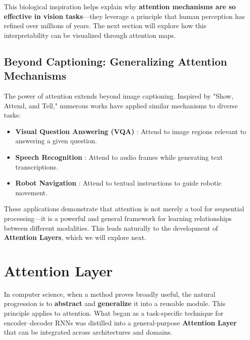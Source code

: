 \noindent This biological inspiration helps explain why \textbf{attention mechanisms are so effective in vision tasks}—they leverage a principle that human perception has refined over millions of years. The next section will explore how this interpretability can be visualized through attention maps.

\subsection{Beyond Captioning: Generalizing Attention Mechanisms}

\noindent The power of attention extends beyond image captioning. Inspired by "Show, Attend, and Tell," numerous works have applied similar mechanisms to diverse tasks:

\begin{itemize}
    \item \textbf{Visual Question Answering (VQA)} \cite{xu2016_askattend}: Attend to image regions relevant to answering a given question.
    \item \textbf{Speech Recognition} \cite{chan2016_listenattend}: Attend to audio frames while generating text transcriptions.
    \item \textbf{Robot Navigation} \cite{mei2016_listenwalk}: Attend to textual instructions to guide robotic movement.
\end{itemize}

\noindent These applications demonstrate that attention is not merely a tool for sequential processing—it is a powerful and general framework for learning relationships between different modalities. This leads naturally to the development of \textbf{Attention Layers}, which we will explore next.

\section{Attention Layer}
\label{sec:chapter17_attention_layer}

\noindent
In computer science, when a method proves broadly useful, the natural progression is to \textbf{abstract} and \textbf{generalize} it into a reusable module.
This principle applies to attention.
What began as a task-specific technique for encoder--decoder RNNs was distilled into a general-purpose \textbf{Attention Layer} that can be integrated across architectures and domains.


